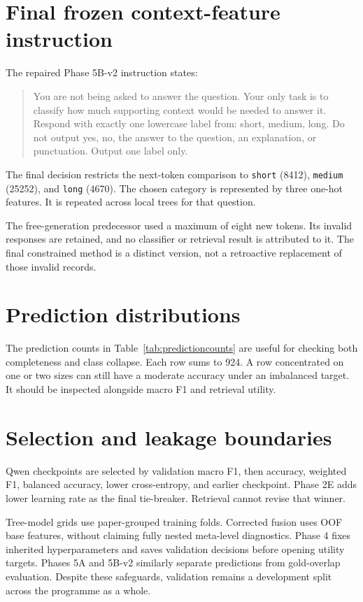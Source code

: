 \section{Final frozen context-feature instruction}
The repaired Phase 5B-v2 instruction states:
\begin{quote}
You are not being asked to answer the question. Your only task is
to classify how much supporting context would be needed to answer
it. Respond with exactly one lowercase label from: short, medium,
long. Do not output yes, no, the answer to the question, an
explanation, or punctuation. Output one label only.
\end{quote}
The final decision restricts the next-token comparison to
\texttt{short} (8412), \texttt{medium} (25252), and
\texttt{long} (4670). The chosen category is represented by three
one-hot features. It is repeated across local trees for that question.

The free-generation predecessor used a maximum of eight new tokens.
Its invalid responses are retained, and no classifier or retrieval
result is attributed to it. The final constrained method is a
distinct version, not a retroactive replacement of those invalid
records.

\section{Prediction distributions}

The prediction counts in Table~\ref{tab:predictioncounts} are useful
for checking both completeness and class collapse. Each row sums
to 924. A row concentrated on one or two sizes can still have a
moderate accuracy under an imbalanced target. It should be inspected
alongside macro F1 and retrieval utility.

\section{Selection and leakage boundaries}
Qwen checkpoints are selected by validation macro F1, then accuracy,
weighted F1, balanced accuracy, lower cross-entropy, and earlier
checkpoint. Phase 2E adds lower learning rate as the final tie-breaker.
Retrieval cannot revise that winner.

Tree-model grids use paper-grouped training folds. Corrected fusion
uses OOF base features, without claiming fully nested meta-level
diagnostics. Phase 4 fixes inherited hyperparameters and saves
validation decisions before opening utility targets. Phases 5A and
5B-v2 similarly separate predictions from gold-overlap evaluation.
Despite these safeguards, validation remains a development split
across the programme as a whole.

